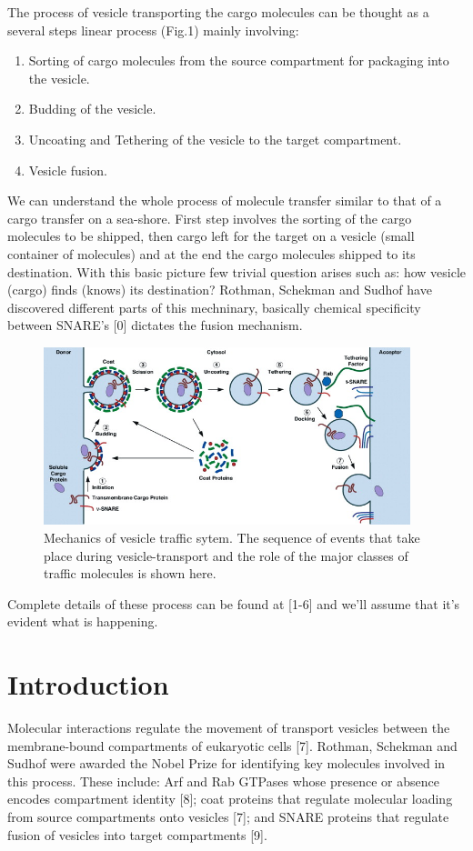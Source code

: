 \documentclass[preprint,12pt]{elsarticle}
\begin{document}
The process of vesicle transporting the cargo molecules can be thought as a several steps linear process (Fig.1) mainly involving:  
\begin{enumerate}
\item Sorting of cargo molecules from the source compartment for packaging into the vesicle.
\item Budding of the vesicle.
\item Uncoating and Tethering of the vesicle to the target compartment.
\item Vesicle fusion.
\end{enumerate}
We can understand the whole process of molecule transfer similar to that of a cargo transfer on a sea-shore. First step involves the sorting of the cargo molecules to be shipped, then cargo left for the target on a vesicle (small container of molecules) and at the end the cargo molecules shipped to its destination. With this basic picture few trivial question arises such as: how vesicle (cargo) finds (knows) its destination? Rothman, Schekman and Sudhof have discovered different parts of this mechninary, basically chemical specificity between SNARE's [0] dictates the fusion mechanism.

\begin{figure}[!ht]
  \caption{Mechanics of vesicle traffic sytem. The sequence of events that take place during vesicle-transport and the role of the major classes of traffic molecules is shown here.}
  \centering
   \includegraphics[width=0.95\textwidth]{2.jpg}
\end{figure}

Complete details of these process can be found at [1-6] and we'll assume that it's evident what is happening. 
 
\section{Introduction} Molecular interactions regulate the movement of transport vesicles between the membrane-bound compartments of eukaryotic cells [7]. Rothman, Schekman and Sudhof were awarded the Nobel Prize for identifying key molecules involved in this process. These include: Arf and Rab GTPases whose presence or absence encodes compartment identity [8]; coat proteins that regulate molecular loading from source compartments onto vesicles [7]; and SNARE proteins that regulate fusion of vesicles into target compartments [9].
\end{document}
